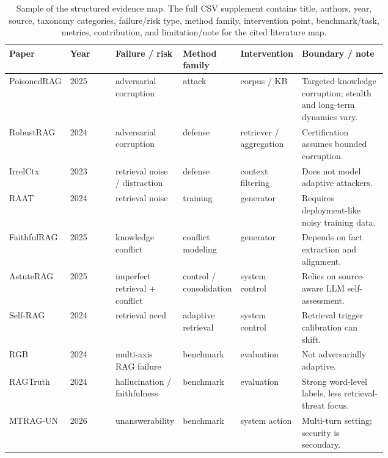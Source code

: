 \begin{table}[t]
\centering
\scriptsize
\renewcommand{\arraystretch}{0.92}
\begin{tabularx}{\linewidth}{p{0.13\linewidth}p{0.12\linewidth}p{0.16\linewidth}p{0.15\linewidth}p{0.16\linewidth}X}
\toprule
\textbf{Paper} & \textbf{Year} & \textbf{Failure / risk} & \textbf{Method family} & \textbf{Intervention} & \textbf{Boundary / note} \\
\midrule
PoisonedRAG & 2025 & adversarial corruption & attack & corpus / KB & Targeted knowledge corruption; stealth and long-term dynamics vary. \\
RobustRAG & 2024 & adversarial corruption & defense & retriever / aggregation & Certification assumes bounded corruption. \\
IrrelCtx & 2023 & retrieval noise / distraction & defense & context filtering & Does not model adaptive attackers. \\
RAAT & 2024 & retrieval noise & training & generator & Requires deployment-like noisy training data. \\
FaithfulRAG & 2025 & knowledge conflict & conflict modeling & generator & Depends on fact extraction and alignment. \\
AstuteRAG & 2025 & imperfect retrieval + conflict & control / consolidation & system control & Relies on source-aware LLM self-assessment. \\
Self-RAG & 2024 & retrieval need & adaptive retrieval & system control & Retrieval trigger calibration can shift. \\
RGB & 2024 & multi-axis RAG failure & benchmark & evaluation & Not adversarially adaptive. \\
RAGTruth & 2024 & hallucination / faithfulness & benchmark & evaluation & Strong word-level labels, less retrieval-threat focus. \\
MTRAG-UN & 2026 & unanswerability & benchmark & system action & Multi-turn setting; security is secondary. \\
\bottomrule
\end{tabularx}
\caption{Sample of the structured evidence map. The full CSV supplement contains title, authors, year, source, taxonomy categories, failure/risk type, method family, intervention point, benchmark/task, metrics, contribution, and limitation/note for the cited literature map.}
\label{tab:evidence-map-sample}
\end{table}


